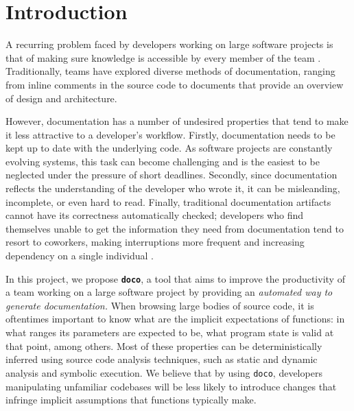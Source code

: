 \section{Introduction}

A recurring problem faced by developers working on large software projects is
that of making sure knowledge is accessible by every member of the team \cite{Ko:2007}.
Traditionally, teams have explored diverse methods of documentation, ranging
from inline comments in the source code to documents that provide an overview
of design and architecture.

However, documentation has a number of undesired properties that tend to make
it less attractive to a developer's workflow. Firstly, documentation needs to
be kept up to date with the underlying code. As software projects are
constantly evolving systems, this task can become challenging and is the
easiest to be neglected under the pressure of short deadlines. Secondly, since
documentation reflects the understanding of the developer who wrote it, it can
be misleanding, incomplete, or even hard to read. Finally, traditional
documentation artifacts cannot have its correctness automatically checked;
developers who find themselves unable to get the information they need from
documentation tend to resort to coworkers, making interruptions more frequent
and increasing dependency on a single individual \cite{Ko:2007}.

In this project, we propose \textbf{\texttt{doco}}, a tool that aims to improve
the productivity of a team working on a large software project by providing an
\emph{automated way to generate documentation.} When browsing large bodies of
source code, it is oftentimes important to know what are the implicit
expectations of functions: in what ranges its parameters are expected to be,
what program state is valid at that point, among others.  Most of these
properties can be deterministically inferred using source code analysis
techniques, such as static and dynamic analysis and symbolic execution. We
believe that by using \texttt{doco}, developers manipulating unfamiliar
codebases will be less likely to introduce changes that infringe implicit
assumptions that functions typically make.
